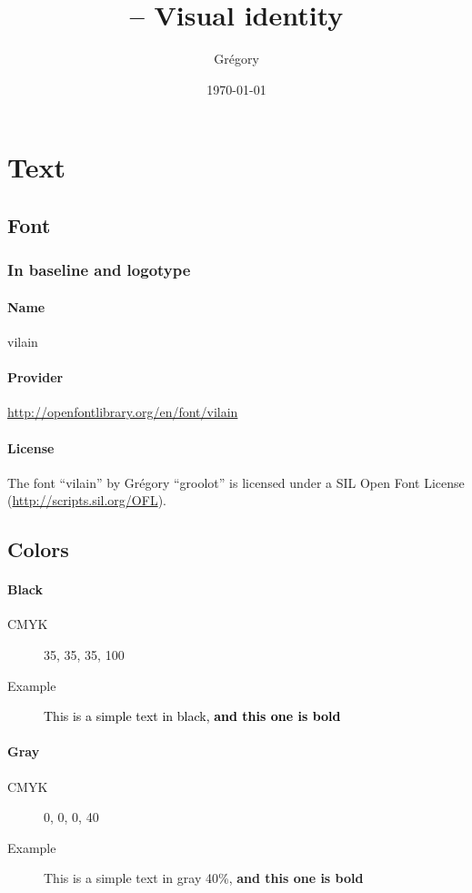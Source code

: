 \documentclass[a4paper,oneside,table]{article}
\author{Grégory \bsc{David}}
\title{\vilain{} -- Visual identity}
\date{\today{}}
\begin{document}
\maketitle{}
\tableofcontents{}

\newpage
\section{Text}
\subsection{Font}
\subsubsection{In baseline and logotype}
\paragraph{Name} vilain
\paragraph{Provider}
\url{http://openfontlibrary.org/en/font/vilain}
\paragraph{License} The font “vilain” by Grégory ``groolot''
 is licensed under a SIL Open Font License
(\url{http://scripts.sil.org/OFL}).

\subsection{Colors}
\paragraph{Black}
\begin{description}
    \item[CMYK] 35, 35, 35, 100
    \item[Example] \textcolor{black}{This is a simple text in
  black, \textbf{and this one is bold}}
\end{description}

\paragraph{Gray}
\begin{description}
    \item[CMYK] 0, 0, 0, 40
    \item[Example] \textcolor{vilainGray}{This is a simple text in
  gray 40\%, \textbf{and this one is bold}}
\end{description}
\end{document}
